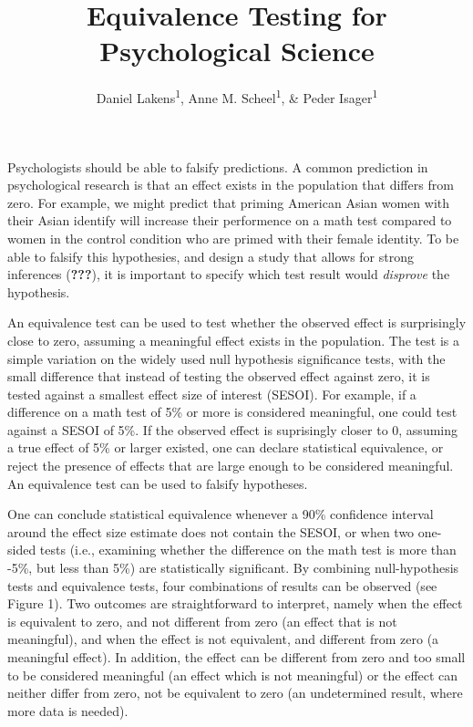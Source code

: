 \documentclass[english,man]{apa6}
\title{Equivalence Testing for Psychological Science}
\author{Daniel Lakens\textsuperscript{1}, Anne M. Scheel\textsuperscript{1}, \& Peder Isager\textsuperscript{1}}
\affiliation{
    \vspace{0.5cm}
          \textsuperscript{1} Eindhoven University of Technology  }
\theoremstyle{definition}
\theoremstyle{definition}
\theoremstyle{definition}
\theoremstyle{remark}
\begin{document}
\maketitle

\setcounter{secnumdepth}{0}



Psychologists should be able to falsify predictions. A common prediction
in psychological research is that an effect exists in the population
that differs from zero. For example, we might predict that priming
American Asian women with their Asian identify will increase their
performence on a math test compared to women in the control condition
who are primed with their female identity. To be able to falsify this
hypothesies, and design a study that allows for strong inferences
({\textbf{???}}), it is important to specify which test result would
\emph{disprove} the hypothesis.

An equivalence test can be used to test whether the observed effect is
surprisingly close to zero, assuming a meaningful effect exists in the
population. The test is a simple variation on the widely used null
hypothesis significance tests, with the small difference that instead of
testing the observed effect against zero, it is tested against a
smallest effect size of interest (SESOI). For example, if a difference
on a math test of 5\% or more is considered meaningful, one could test
against a SESOI of 5\%. If the observed effect is suprisingly closer to
0, assuming a true effect of 5\% or larger existed, one can declare
statistical equivalence, or reject the presence of effects that are
large enough to be considered meaningful. An equivalence test can be
used to falsify hypotheses.

One can conclude statistical equivalence whenever a 90\% confidence
interval around the effect size estimate does not contain the SESOI, or
when two one-sided tests (i.e., examining whether the difference on the
math test is more than -5\%, but less than 5\%) are statistically
significant. By combining null-hypothesis tests and equivalence tests,
four combinations of results can be observed (see Figure 1). Two
outcomes are straightforward to interpret, namely when the effect is
equivalent to zero, and not different from zero (an effect that is not
meaningful), and when the effect is not equivalent, and different from
zero (a meaningful effect). In addition, the effect can be different
from zero and too small to be considered meaningful (an effect which is
not meaningful) or the effect can neither differ from zero, not be
equivalent to zero (an undetermined result, where more data is needed).
\end{document}
